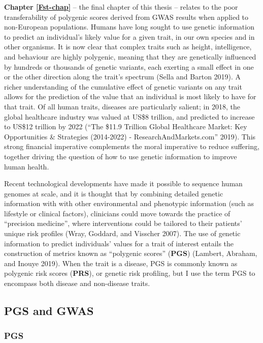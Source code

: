 \documentclass[
]{book}
\begin{document}
\textbf{Chapter \ref{Fst-chap}} -- the final chapter of this thesis -- relates to the poor transferability of polygenic scores derived from GWAS results when applied to non-European populations. Humans have long sought to use genetic information to predict an individual's likely value for a given trait, in our own species and in other organisms. It is now clear that complex traits such as height, intelligence, and behaviour are highly polygenic, meaning that they are genetically influenced by hundreds or thousands of genetic variants, each exerting a small effect in one or the other direction along the trait's spectrum (Sella and Barton 2019). A richer understanding of the cumulative effect of genetic variants on any trait allows for the prediction of the value that an individual is most likely to have for that trait. Of all human traits, diseases are particularly salient; in 2018, the global healthcare industry was valued at US\$8 trillion, and predicted to increase to US\$12 trillion by 2022 ({``The \$11.9 {Trillion Global Healthcare Market}: {Key Opportunities} \& {Strategies} (2014-2022) - {ResearchAndMarkets}.com''} 2019). This strong financial imperative complements the moral imperative to reduce suffering, together driving the question of how to use genetic information to improve human health.

Recent technological developments have made it possible to sequence human genomes at scale, and it is thought that by combining detailed genetic information with with other environmental and phenotypic information (such as lifestyle or clinical factors), clinicians could move towards the practice of ``precision medicine'', where interventions could be tailored to their patients' unique risk profiles (Wray, Goddard, and Visscher 2007). The use of genetic information to predict individuals' values for a trait of interest entails the construction of metrics known as ``polygenic scores'' (\textbf{PGS}) (Lambert, Abraham, and Inouye 2019). When the trait is a disease, PGS is commonly known as polygenic risk scores (\textbf{PRS}), or genetic risk profiling, but I use the term PGS to encompass both disease and non-disease traits.

\hypertarget{pgs-intro}{%
\subsection{PGS and GWAS}\label{pgs-intro}}

\hypertarget{pgs}{%
\subsubsection{PGS}\label{pgs}}
\end{document}
